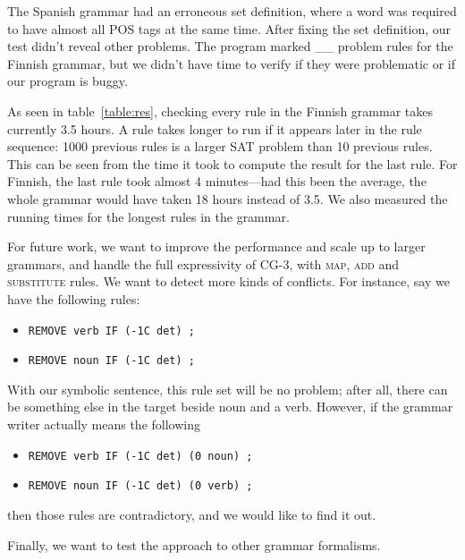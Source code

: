 The Spanish grammar had an erroneous set definition, where a word was required to have almost all POS tags at the same time. After fixing the set definition, our test didn't reveal other problems.
The program marked __ problem rules for the Finnish grammar, but we didn't have time to verify if they were problematic or if our program is buggy.

As seen in table~\ref{table:res}, checking every rule in the Finnish grammar takes currently 3.5 hours.
A rule takes longer to run if it appears later in the rule sequence: 1000 previous rules is a larger SAT problem than 10 previous rules.
This can be seen from the time it took to compute the result for the last rule. For Finnish, the last rule took almost 4 minutes---had this been the average, the whole grammar would have taken 18 hours instead of 3.5.
We also measured the running times for the longest rules in the grammar.



For future work, we want to improve the performance and scale up to larger grammars, and handle the full expressivity of CG-3, with \textsc{map}, \textsc{add} and \textsc{substitute} rules.
We want to detect more kinds of conflicts.
For instance, say we have the following rules:

\begin{itemize}
\item[] \texttt{REMOVE verb IF (-1C det) ;}
\item[] \texttt{REMOVE noun IF (-1C det) ;}
\end{itemize}

With our symbolic sentence, this rule set will be no problem; after all, there can be something else in the target beside noun and a verb.
However, if the grammar writer actually means the following

\begin{itemize}
\item[] \texttt{REMOVE verb IF (-1C det) (0 noun) ;}
\item[] \texttt{REMOVE noun IF (-1C det) (0 verb) ;}
\end{itemize}

then those rules are contradictory, and we would like to find it out.


Finally, we want to test the approach to other grammar formalisms.




